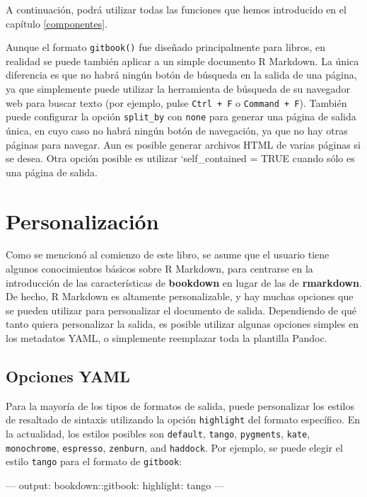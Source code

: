 \documentclass[12pt,]{krantz}
\makeatletter
\newenvironment{Shaded}{\begin{snugshade}}{\end{snugshade}}
\newcommand{\OtherTok}[1]{\textcolor[rgb]{0.56,0.35,0.01}{#1}}
\newcommand{\FunctionTok}[1]{\textcolor[rgb]{0.00,0.00,0.00}{#1}}
\newcommand{\AttributeTok}[1]{\textcolor[rgb]{0.77,0.63,0.00}{#1}}
\newenvironment{kframe}{%
\medskip{}
\setlength{\fboxsep}{.8em}
 \def\at@end@of@kframe{}%
 \ifinner\ifhmode%
  \def\at@end@of@kframe{\end{minipage}}%
  \begin{minipage}{\columnwidth}%
 \fi\fi%
 \def\FrameCommand##1{\hskip\@totalleftmargin \hskip-\fboxsep
 \colorbox{shadecolor}{##1}\hskip-\fboxsep
     \hskip-\linewidth \hskip-\@totalleftmargin \hskip\columnwidth}%
 \MakeFramed {\advance\hsize-\width
   \@totalleftmargin\z@ \linewidth\hsize
   \@setminipage}}%
 {\par\unskip\endMakeFramed%
 \at@end@of@kframe}
\renewenvironment{Shaded}{\begin{kframe}}{\end{kframe}}
\theoremstyle{definition}
\theoremstyle{definition}
\theoremstyle{definition}
\theoremstyle{remark}
\makeatother
\begin{document}
A continuación, podrá utilizar todas las funciones que hemos introducido
en el capítulo \ref{componentes}.

Aunque el formato \texttt{gitbook()} fue diseñado principalmente para
libros, en realidad se puede también aplicar a un simple documento R
Markdown. La única diferencia es que no habrá ningún botón de búsqueda
en la salida de una página, ya que simplemente puede utilizar la
herramienta de búsqueda de su navegador web para buscar texto (por
ejemplo, pulse \texttt{Ctrl\ +\ F} o \texttt{Command\ +\ F}). También
puede configurar la opción \texttt{split\_by} con \texttt{none} para
generar una página de salida única, en cuyo caso no habrá ningún botón
de navegación, ya que no hay otras páginas para navegar. Aun es posible
generar archivos HTML de varias páginas si se desea. Otra opción posible
es utilizar `self\_contained = TRUE cuando sólo es una página de salida.

\chapter{Personalización}\label{personalizacion}

Como se mencionó al comienzo de este libro, se asume que el usuario
tiene algunos conocimientos básicos sobre R Markdown, para centrarse en
la introducción de las características de \textbf{bookdown} en lugar de
las de \textbf{rmarkdown}. De hecho, R Markdown es altamente
personalizable, y hay muchas opciones que se pueden utilizar para
personalizar el documento de salida. Dependiendo de qué tanto quiera
personalizar la salida, es posible utilizar algunas opciones simples en
los metadatos YAML, o simplemente reemplazar toda la plantilla Pandoc.

\section{Opciones YAML}\label{opciones-yaml}

Para la mayoría de los tipos de formatos de salida, puede
personalizar los estilos de resaltado de sintaxis utilizando la opción
\texttt{highlight} del formato específico. En la actualidad, los estilos
posibles son \texttt{default}, \texttt{tango}, \texttt{pygments},
\texttt{kate}, \texttt{monochrome}, \texttt{espresso}, \texttt{zenburn},
and \texttt{haddock}. Por ejemplo, se puede elegir el estilo
\texttt{tango} para el formato de \texttt{gitbook}:

\begin{Shaded}
\begin{Highlighting}[]
\OtherTok{---}
\FunctionTok{output:}
  \FunctionTok{bookdown:}\AttributeTok{:gitbook:}
    \FunctionTok{highlight:}\AttributeTok{ tango}
\OtherTok{---}
\end{Highlighting}
\end{Shaded}
\end{document}
